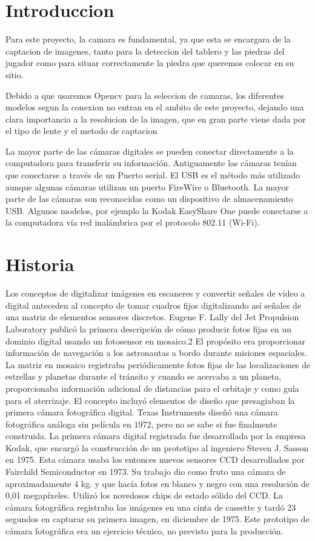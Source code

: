 \documentclass[12pt,a4paper]{report}
\begin{document}
\section{Introduccion}

Para este proyecto, la camara es fundamental, ya que esta se encargara de la captacion de imagenes, tanto para la deteccion del tablero y las piedras del jugador como para situar correctamente la piedra que queremos colocar en su sitio.

Debido a que usaremos Opencv para la seleccion de camaras, los diferentes modelos segun la conexion no entran en el ambito de este proyecto, dejando una clara importancia a la resolucion de la imagen, que en gran parte viene dada por el tipo de lente y el metodo de captacion 

La mayor parte de las cámaras digitales se pueden conectar directamente a la computadora para transferir su información. Antiguamente las cámaras tenían que conectarse a través de un Puerto serial. El USB es el método más utilizado aunque algunas cámaras utilizan un puerto FireWire o Bluetooth. La mayor parte de las cámaras son reconocidas como un dispositivo de almacenamiento USB. Algunos modelos, por ejemplo la Kodak EasyShare One puede conectarse a la computadora vía red inalámbrica por el protocolo 802.11 (Wi-Fi).

 
\section{Historia}

Los conceptos de digitalizar imágenes en escaneres y convertir señales de video a digital anteceden al concepto de tomar cuadros fijos digitalizando así señales de una matriz de elementos sensores discretos. Eugene F. Lally del Jet Propulsion Laboratory publicó la primera descripción de cómo producir fotos fijas en un dominio digital usando un fotosensor en mosaico.2 El propósito era proporcionar información de navegación a los astronautas a bordo durante misiones espaciales. La matriz en mosaico registraba periódicamente fotos fijas de las localizaciones de estrellas y planetas durante el tránsito y cuando se acercaba a un planeta, proporcionaba información adicional de distancias para el orbitaje y como guía para el aterrizaje. El concepto incluyó elementos de diseño que presagiaban la primera cámara fotográfica digital.
Texas Instruments diseñó una cámara fotográfica análoga sin película en 1972, pero no se sabe si fue finalmente construida. La primera cámara digital registrada fue desarrollada por la empresa Kodak, que encargó la construcción de un prototipo al ingeniero Steven J. Sasson en 1975. Esta cámara usaba los entonces nuevos sensores CCD desarrollados por Fairchild Semiconductor en 1973. Su trabajo dio como fruto una cámara de aproximadamente 4 kg. y que hacía fotos en blanco y negro con una resolución de 0,01 megapíxeles. Utilizó los novedosos chips de estado sólido del CCD. La cámara fotográfica registraba las imágenes en una cinta de cassette y tardó 23 segundos en capturar su primera imagen, en diciembre de 1975. Este prototipo de cámara fotográfica era un ejercicio técnico, no previsto para la producción.
\end{document}
